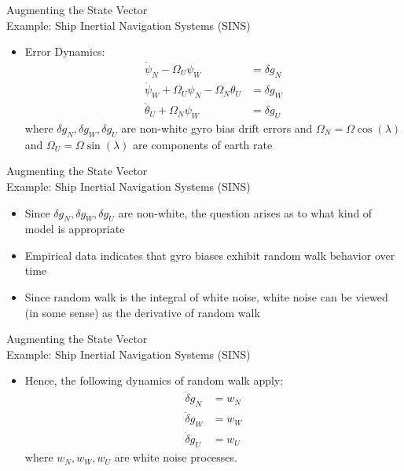 \begin{frame}
Augmenting the State Vector\\
Example: Ship Inertial Navigation Systems (SINS)
\begin{itemize}
  \item Error Dynamics:
\begin{align*}
\dot{\psi}_N - \Omega_U\psi_W &= \delta g_N\\
\dot{\psi}_W + \Omega_U \psi_N - \Omega_N\theta_U &= \delta g_W\\
\dot{\theta}_U + \Omega_N \psi_W &= \delta g_U
\end{align*}
where $\delta g_N,\delta g_W,\delta g_U$ are non-white gyro bias drift errors and $\Omega_N=\Omega\cos(\lambda)$ and $\Omega_U=\Omega\sin(\lambda)$ are components of earth rate
\end{itemize} 
\end{frame}
\begin{frame}
Augmenting the State Vector\\
Example: Ship Inertial Navigation Systems (SINS)
\begin{itemize}
  \item Since $\delta g_N,\delta g_W,\delta g_U$ are non-white, the question arises as to what kind of model is appropriate
  \item Empirical data indicates that gyro biases exhibit random walk behavior over time
  \item Since random walk is the integral of white noise, white noise can be viewed (in some sense) as the derivative of random walk
\end{itemize} 
\end{frame}
\begin{frame}
Augmenting the State Vector\\
Example: Ship Inertial Navigation Systems (SINS)
\begin{itemize}
  \item Hence, the following dynamics of random walk apply:
\begin{align*}
\dot{\delta} g_N &= w_N\\
\dot{\delta} g_W &= w_W\\
\dot{\delta} g_U &= w_U
\end{align*}
where $w_N,w_W,w_U$ are white noise processes.
\end{itemize} 
\end{frame}
